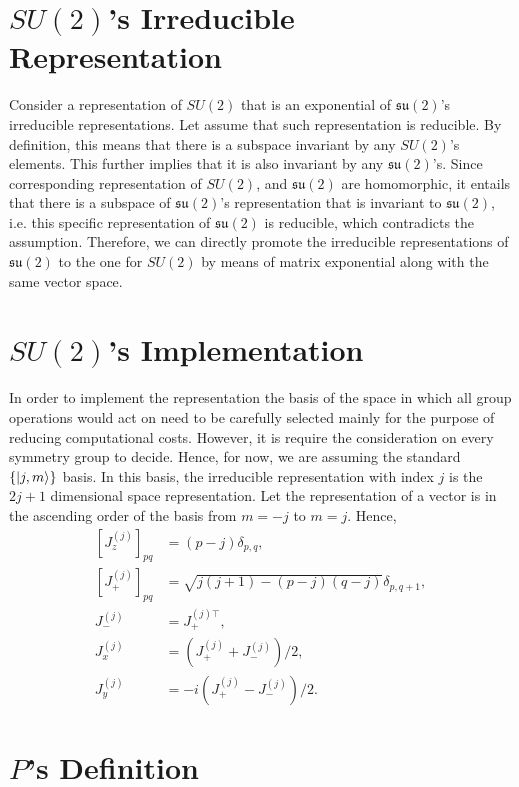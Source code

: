 \documentclass[12pt]{revtex4-2}
\begin{document}
\section{$SU(2)$'s Irreducible Representation}
Consider a representation of $SU(2)$ that is an exponential of $\mathfrak{su(2)}$'s irreducible representations. Let assume
that such representation is reducible. By definition, this means that there is a subspace invariant by any $SU(2)$'s elements.
This further implies that it is also invariant by any $\mathfrak{su(2)}$'s. Since corresponding representation of $SU(2)$,
and $\mathfrak{su(2)}$ are homomorphic, it entails that there is a subspace of $\mathfrak{su(2)}$'s representation that is
invariant to $\mathfrak{su(2)}$, i.e. this specific representation of $\mathfrak{su(2)}$ is reducible, which contradicts
the assumption. Therefore, we can directly promote the irreducible representations of $\mathfrak{su(2)}$ to the one for 
$SU(2)$ by means of matrix exponential along with the same vector space.

\section{$SU(2)$'s Implementation}
In order to implement the representation the basis of the space in which all group operations would act on need to be carefully
selected mainly for the purpose of reducing computational costs. However, it is require the consideration on every symmetry
group to decide. Hence, for now, we are assuming the standard $\{\ket{j, m}\}$ basis. In this basis, the irreducible
representation with index $j$ is the $2j+1$ dimensional space representation. Let the representation of a vector is in 
the ascending order of the basis from $m = -j$ to $m = j$. Hence,
\begin{equation}
    \begin{aligned}
        \left[J_z^{(j)}\right]_{pq} &= (p-j)\delta_{p,q}, \\
        \left[J_+^{(j)}\right]_{pq} &= \sqrt{j(j+1)-(p-j)(q-j)}\delta_{p,q+1}, \\
        J_-^{(j)} &= J_+^{(j)\top}, \\
        J_x^{(j)} &= \left(J_+^{(j)}+J_-^{(j)}\right)/2, \\
        J_y^{(j)} &= -i\left(J_+^{(j)}-J_-^{(j)}\right)/2.
    \end{aligned}
\end{equation}

\section{$P$'s Definition}
\end{document}
